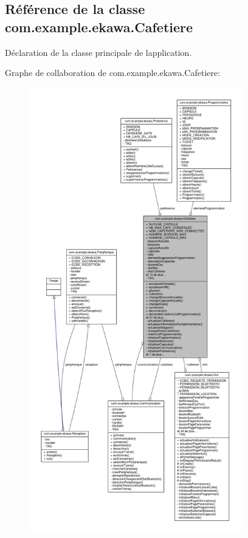 \hypertarget{classcom_1_1example_1_1ekawa_1_1_cafetiere}{}\subsection{Référence de la classe com.\+example.\+ekawa.\+Cafetiere}
\label{classcom_1_1example_1_1ekawa_1_1_cafetiere}


Déclaration de la classe principale de l\textquotesingle{}application.  




Graphe de collaboration de com.\+example.\+ekawa.\+Cafetiere\+:\nopagebreak
\begin{figure}[H]
\begin{center}
\leavevmode
\includegraphics[height=550pt]{classcom_1_1example_1_1ekawa_1_1_cafetiere__coll__graph}
\end{center}
\end{figure}
